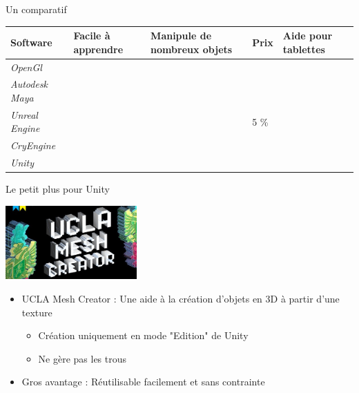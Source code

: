 \documentclass[a4paper,10pt]{beamer}
\begin{document}
		\begin{frame}{Un comparatif}
			\begin{tabular}{|M{45pt}|M{40pt}|M{45pt}|M{75pt}|M{30pt}|}
				\hline
				\textbf{Software} & \textbf{Facile à apprendre} & \textbf{Manipule de nombreux objets} & \textbf{Prix} & \textbf{Aide pour tablettes}\\
				\hline
				\textit{OpenGl} & \color{red}{$\times$} & \color{orange}{$\sim$} & \color{green}{0\euro} & \color{red}{$\times$}\\
				\hline
				\textit{Autodesk Maya} & \color{red}{$\times$} & \color{green}{\checkmark} & \color{red}{\$185.00/mois} & \color{orange}{$\sim$}\\
				\hline
				\textit{Unreal Engine} & \color{green}{\checkmark} & \color{green}{\checkmark} & \color{orange}5 \% & \color{red}{$\times$}\\
				\hline
				\textit{CryEngine} & \color{green}{\checkmark} & \color{green}{\checkmark} & \color{orange}{9.99\euro/mois} & \color{orange}{$\sim$}\\
				\hline
				\textit{Unity} & \color{green}{\checkmark} & \color{green}{\checkmark} & \color{green}{0\euro : licence gratuite} & \color{green}{\checkmark} \\
				\hline
			\end{tabular}
		\end{frame}
		
		\begin{frame}{Le petit plus pour Unity}
			\centerline{\includegraphics[height=80pt]{images/techno/ucla.jpg}}
			
			\begin{itemize}
				\item UCLA Mesh Creator : Une aide à la création d'objets en 3D à partir d'une texture
					\begin{itemize}
						\item Création uniquement en mode "Edition" de Unity
						\item Ne gère pas les trous
					\end{itemize}
				\item Gros avantage : Réutilisable facilement et sans contrainte
			\end{itemize}
			
		\end{frame}
		
\end{document}
